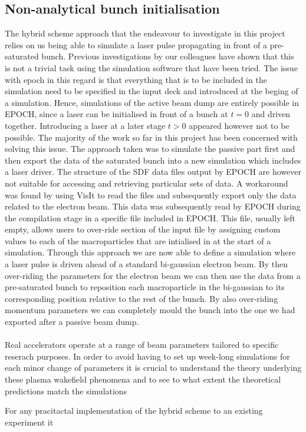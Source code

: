 \subsection{Non-analytical bunch initialisation}
The hybrid scheme approach that the endeavour to investigate in this project relies on us being able to simulate a laser pulse propagating in front of a pre-saturated bunch. Previous investigations by our colleagues have shown that this is not a trivial task using the simulation software that have been tried. The issue with epoch in this regard is that everything that is to be included in the simulation need to be specified in the input deck and introduced at the beging of a simulation. Hence, simulations of the active beam dump are entirely possible in EPOCH, since a laser can be initialised in front of a bunch at $t=0$ and driven together. Introducing a laser at a later stage $t>0$ appeared however not to be possible. The majority of the work so far in this project has been concerned with solving this issue. The approach taken was to simulate the passive part first and then export the data of the saturated bunch into a new simulation which includes a laser driver. The structure of the SDF data files output by EPOCH are however not suitable for accessing and retrieving particular sets of data. A workaround was found by using VisIt to read the files and subsequently export only the data related to the electron beam. This data was subsequently read by EPOCH during the compilation stage in a specific file included in EPOCH. This file, usually left empty, allows users to over-ride section of the input file by assigning custom values to each of the macroparticles that are intialised in at the start of a simulation. Through this approach we are now able to define a simulation where a laser pulse is driven ahead of a standard bi-gaussian electron beam. By then over-riding the parameters for the electron beam we can then use the data from a pre-saturated bunch to reposition each macroparticle in the bi-gaussian to its corresponding position relative to the rest of the bunch. By also over-riding momentum parameters we can completely mould the bunch into the one we had exported after a passive beam dump. \\
\\
Real accelerators operate at a range of beam parameters tailored to specific reserach purposes. In order to avoid having to set up week-long simulations for each minor change of parameters it is crucial to understand the theory underlying these plasma wakefield phenomena and to see to what extent the theoretical predictions match the simulations

For any pracitactal implementation of the hybrid scheme to an existing experiment it 
